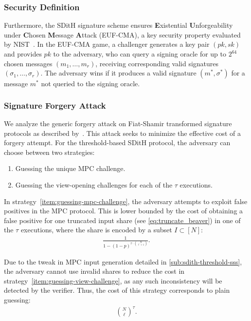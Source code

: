 \documentclass[11pt]{report}
\theoremstyle{definition}
\theoremstyle{plain}
\begin{document}
\subsubsection{Security Definition}

Furthermore, the SDitH signature scheme ensures \textbf{E}xistential \textbf{U}nforgeability under \textbf{C}hosen \textbf{M}essage \textbf{A}ttack (EUF-CMA), a key security property evaluated by NIST~\cite{nistcall,aguilarsyndrome11}. In the EUF-CMA game, a challenger generates a key pair $(pk, sk)$ and provides $pk$ to the adversary, who can query a signing oracle for up to $2^{64}$ chosen messages $(m_1, \dots, m_r)$, receiving corresponding valid signatures $(\sigma_1, \dots, \sigma_r)$. The adversary wins if it produces a valid signature $(m^*, \sigma^*)$ for a message $m^*$ not queried to the signing oracle.

\subsubsection{Signature Forgery Attack}

We analyze the generic forgery attack on Fiat-Shamir transformed signature protocols as described by~\cite{kales2020attack}. This attack seeks to minimize the effective cost of a forgery attempt. For the threshold-based SDitH protocol, the adversary can choose between two strategies:
\begin{enumerate}
  \item \label{item:guessing-mpc-challenge} Guessing the unique MPC challenge.
  \item \label{item:guessing-view-challenge} Guessing the view-opening challenges for each of the $\tau$ executions.
\end{enumerate}

In strategy~\ref*{item:guessing-mpc-challenge}, the adversary attempts to exploit false positives in the MPC protocol. This is lower bounded by the cost of obtaining a false positive for one truncated input share (see \autoref{eq:truncate_beaver}) in one of the $\tau$ executions, where the share is encoded by a subset $I \subset [N]$:
\begin{align*}
  \frac{1}{1 - (1-p)^{\tau \cdot \binom{N}{\ell + 1}}}.
\end{align*}

Due to the tweak in MPC input generation detailed in \autoref{sub:sdith-threshold-sss}, the adversary cannot use invalid shares to reduce the cost in strategy~\ref*{item:guessing-view-challenge}, as any such inconsistency will be detected by the verifier. Thus, the cost of this strategy corresponds to plain guessing:
\begin{align*}
  \binom{N}{\ell}^\tau.
\end{align*}
\end{document}
